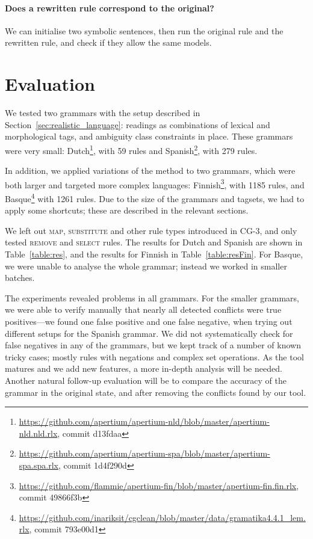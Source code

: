 {{\paragraph{Does a rewritten rule correspond to the original?}
We can initialise two symbolic sentences, then run the original rule and the rewritten rule, and check if they allow the same models. 

\section{Evaluation}
\label{sec:eval}

We tested two grammars with the setup described in
Section~\ref{sec:realistic_language}: readings as combinations of
lexical and morphological tags, and ambiguity class constraints in place.
These grammars were very small:
Dutch\footnote{\scriptsize{\url{https://github.com/apertium/apertium-nld/blob/master/apertium-nld.nld.rlx}, commit d13fdaa}},
with 59 rules and 
Spanish\footnote{\scriptsize{\url{https://github.com/apertium/apertium-spa/blob/master/apertium-spa.spa.rlx}, commit 1d4f290d}},
with 279 rules.

In addition, we applied variations of the method to two grammars,
which were both larger and targeted more complex languages:
Finnish\footnote{\scriptsize{\url{https://github.com/flammie/apertium-fin/blob/master/apertium-fin.fin.rlx}, commit 49866f3b}},
with 1185 rules, and
Basque\footnote{\scriptsize{\url{https://github.com/inariksit/cgclean/blob/master/data/gramatika4.4.1_lem.rlx}, commit 793e00d1}}
with 1261 rules. Due to the size of the grammars and tagsets, we had
to apply some shortcuts; these are described in the relevant sections.

We left out \textsc{map}, \textsc{substitute} and other rule
types introduced in CG-3, and only tested \textsc{remove} and \textsc{select} rules.
The results for Dutch and Spanish are shown in Table~\ref{table:res},
and the results for Finnish in Table~\ref{table:resFin}. For Basque,
we were unable to analyse the whole grammar; instead we worked in
smaller batches. 


The experiments revealed problems in all grammars. For the smaller
grammars, we were able to verify manually that nearly all detected conflicts were
true positives---we found one false positive and one false negative,
when trying out different setups for the Spanish grammar. 
We did not systematically check for false negatives in any of the
grammars, but we kept track of a number of known tricky cases; mostly
rules with negations and complex set operations.
As the tool matures and we add new features, a more in-depth analysis
will be needed.
Another natural follow-up evaluation will be to compare the accuracy of the
grammar in the original state, and after removing the conflicts found
by our tool. 


}}
